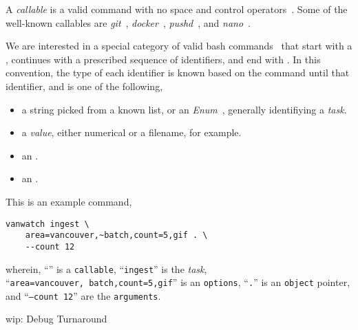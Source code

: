 A \emph{callable} is a valid command with no space and control operators~\cite{control_operators}. Some of the well-known callables are \emph{git}~\cite{git}, \emph{docker}~\cite{docker}, \emph{pushd}~\cite{pushd}, and \emph{nano}~\cite{nano}. 

We are interested in a special category of valid bash commands~\cite{shell_syntax} that start with a , continues with a prescribed sequence of identifiers, and end with \kArguments. In this convention, the type of each identifier is known based on the command until that identifier, and is one of the following,
%
\begin{itemize}
    \item a string picked from a known list, or an \emph{Enum}~\cite{python_eunum}, generally identifiying a \emph{task}.
    \item a \emph{value}, either numerical or a filename, for example.
    \item an .
    \item an .
\end{itemize}
%
This is an example command,
%
\begin{verbatim}
vanwatch ingest \
    area=vancouver,~batch,count=5,gif . \
    --count 12
\end{verbatim}
%
wherein, ``\cVanwatch'' is a \texttt{callable}, ``\texttt{ingest}'' is the \emph{task}, ``\texttt{area=vancouver,~batch,count=5,gif}'' is an \texttt{options}, ``\texttt{.}'' is an \texttt{object} pointer, and ``\texttt{--count 12}'' are the \texttt{arguments}.


wip: Debug Turnaround